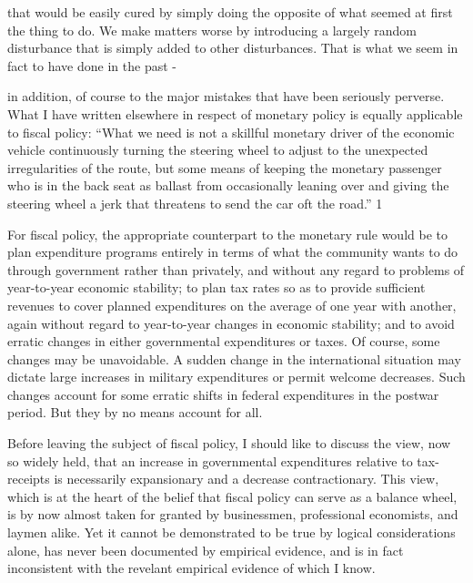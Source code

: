 \documentclass[11pt,openany]{book}
\begin{document}
that would be easily cured by simply doing the opposite of what seemed at first the thing to do. We make matters worse by introducing a largely random disturbance that is simply added to other disturbances. That is what we seem in fact to have done in the past -

in addition, of course to the major mistakes that have been seriously perverse. What I have written elsewhere in respect of monetary policy is equally applicable to fiscal policy: ``What we need is not a skillful monetary driver of the economic vehicle continuously turning the steering wheel to adjust to the unexpected irregularities of the route, but some means of keeping the monetary passenger who is in the back seat as ballast from occasionally leaning over and giving the steering wheel a jerk that threatens to send the car oft the road.'' 1

For fiscal policy, the appropriate counterpart to the monetary rule would be to plan expenditure programs entirely in terms of what the community wants to do through government rather than privately, and without any regard to problems of year-to-year economic stability; to plan tax rates so as to provide sufficient revenues to cover planned expenditures on the average of one year with another, again without regard to year-to-year changes in economic stability; and to avoid erratic changes in either governmental expenditures or taxes. Of course, some changes may be unavoidable. A sudden change in the international situation may dictate large increases in military expenditures or permit welcome decreases. Such changes account for some erratic shifts in federal expenditures in the postwar period. But they by no means account for all.

Before leaving the subject of fiscal policy, I should like to discuss the view, now so widely held, that an increase in governmental expenditures relative to tax-receipts is necessarily expansionary and a decrease contractionary. This view, which is at the heart of the belief that fiscal policy can serve as a balance wheel, is by now almost taken for granted by businessmen, professional economists, and laymen alike. Yet it cannot be demonstrated to be true by logical considerations alone, has never been documented by empirical evidence, and is in fact inconsistent with the revelant empirical evidence of which I know.
\end{document}
